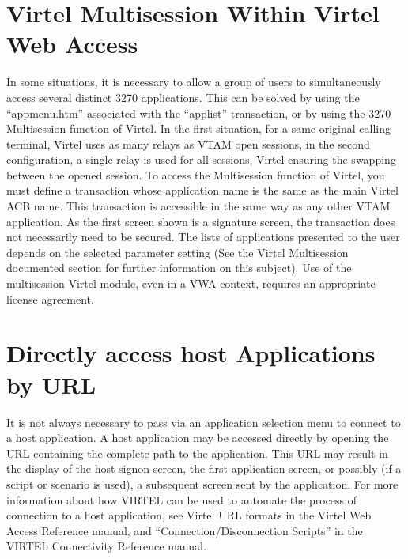 \documentclass[letterpaper,10pt,english]{sphinxmanual}
\begin{document}
\section{Virtel Multi\sphinxhyphen{}session Within Virtel Web Access}
\label{\detokenize{Customization:virtel-multi-session-within-virtel-web-access}}\label{\detokenize{Customization:index-57}}
\sphinxAtStartPar
In some situations, it is necessary to allow a group of users to simultaneously access several distinct 3270 applications. This can be solved by using the “appmenu.htm” associated with the “applist” transaction, or by using the 3270 Multi\sphinxhyphen{}session function of Virtel. In the first situation, for a same original calling terminal, Virtel uses as many relays as VTAM open sessions, in the second configuration, a single relay is used for all sessions, Virtel ensuring the swapping between the opened session. To access the Multi\sphinxhyphen{}session function of Virtel, you must define a transaction whose application name is the same as the main Virtel ACB name. This transaction is accessible in the same way as any other VTAM application. As the first screen shown is a signature screen, the transaction does not necessarily need to be secured. The lists of applications presented to the user depends on the selected parameter setting (See the Virtel Multi\sphinxhyphen{}session documented section for further information on this subject). Use of the multi\sphinxhyphen{}session Virtel module, even in a VWA context, requires an appropriate license agreement.

\sphinxAtStartPar
{}

\sphinxAtStartPar
{}


\section{Directly access host Applications by URL}
\label{\detokenize{Customization:directly-access-host-applications-by-url}}
\ignorespaces 
\sphinxAtStartPar
It is not always necessary to pass via an application selection menu to connect to a host application. A host application may be accessed directly by opening the URL containing the complete path to the application. This URL may result in the display of the host signon screen, the first application screen, or possibly (if a script or scenario is used), a
subsequent screen sent by the application. For more information about how VIRTEL can be used to automate the process of connection to a host application, see Virtel URL formats in the Virtel Web Access Reference manual, and “Connection/Disconnection Scripts” in the VIRTEL Connectivity Reference manual.
\end{document}
